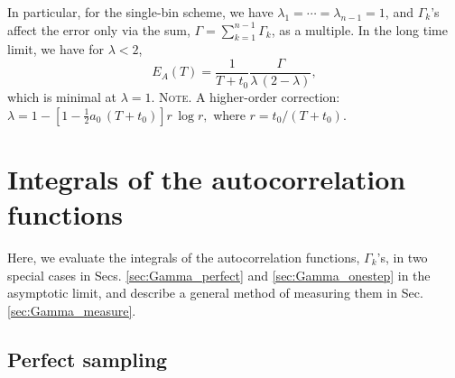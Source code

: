 \documentclass[reprint, floatfix]{revtex4-1}
\newcommand{\note}[1]{{\color{DarkGreen}\footnotesize \textsc{Note.} #1}}
\newcommand{\Err}{E}
\begin{document}
In particular,
for the single-bin scheme, we have
$\lambda_1 = \cdots = \lambda_{n-1} = 1$,
and
$\Gamma_k$'s affect the error
only via the sum, $\Gamma = \sum_{k = 1}^{n-1} \Gamma_k$,
as a multiple.
%
In the long time limit,
we have for $\lambda < 2$,
$$
  \Err_A(T)
  =
  \frac { 1 } { T + t_0 }
  \frac {         \Gamma           }
        { \lambda \, (2 - \lambda) }
  ,
$$
which is minimal at $\lambda = 1$.
%
\note{A higher-order correction:
  $
  \lambda = 1 -
  \left[
    1 - \frac 1 2 a_0 \, (T+t_0)
  \right] r \, \log r
  ,
  $
  where $r = t_0 / (T + t_0)$.
}


\section{\label{sec:Gamma}
Integrals of the autocorrelation functions}



Here, we evaluate the integrals of
the autocorrelation functions,
$\Gamma_k$'s,
in two special cases
in Secs. \ref{sec:Gamma_perfect}
and \ref{sec:Gamma_onestep}
in the asymptotic limit,
and describe a general method of measuring them
in Sec. \ref{sec:Gamma_measure}.



\subsection{\label{sec:Gamma_perfect}
Perfect sampling}
\end{document}
